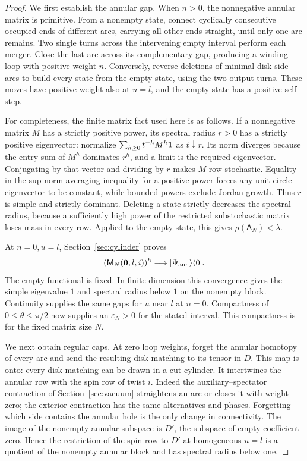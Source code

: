 \begin{proof}
We first establish the annular gap. When \(n>0\), the nonnegative annular matrix is primitive. From a nonempty state, connect cyclically consecutive occupied ends of different arcs, carrying all other ends straight, until only one arc remains. Two single turns across the intervening empty interval perform each merger. Close the last arc across its complementary gap, producing a winding loop with positive weight \(n\). Conversely, reverse deletions of minimal disk-side arcs to build every state from the empty state, using the two output turns. These moves have positive weight also at \(u=l\), and the empty state has a positive self-step.

For completeness, the finite matrix fact used here is as follows. If a nonnegative matrix \(M\) has a strictly positive power, its spectral radius \(r>0\) has a strictly positive eigenvector: normalize
\(\sum_{h\ge0}t^{-h}M^h{\bf1}\) as \(t\downarrow r\). Its norm diverges because the entry sum of \(M^h\) dominates \(r^h\), and a limit is the required eigenvector. Conjugating by that vector and dividing by \(r\) makes \(M\) row-stochastic. Equality in the sup-norm averaging inequality for a positive power forces any unit-circle eigenvector to be constant, while bounded powers exclude Jordan growth. Thus \(r\) is simple and strictly dominant. Deleting a state strictly decreases the spectral radius, because a sufficiently high power of the restricted substochastic matrix loses mass in every row. Applied to the empty state, this gives \(\rho(\mathsf A_N)<\lambda\).

At \(n=0,u=l\), Section~\ref{sec:cylinder} proves
\[
 (\mathsf M_N(\mathbf0,l,i))^h
 \longrightarrow |\Psi_{\rm ann}\rangle\langle0|.
\]
The empty functional is fixed. In finite dimension this convergence gives the simple eigenvalue \(1\) and spectral radius below \(1\) on the nonempty block. Continuity supplies the same gaps for \(u\) near \(l\) at \(n=0\). Compactness of \(0\le\theta\le\pi/2\) now supplies an \(\varepsilon_N>0\) for the stated interval. This compactness is for the fixed matrix size \(N\).

We next obtain regular caps. At zero loop weights, forget the annular homotopy of every arc and send the resulting disk matching to its tensor in \(D\). This map is onto: every disk matching can be drawn in a cut cylinder. It intertwines the annular row with the spin row of twist \(i\). Indeed the auxiliary--spectator contraction of Section~\ref{sec:vacuum} straightens an arc or closes it with weight zero; the exterior contraction has the same alternatives and phases. Forgetting which side contains the annular hole is the only change in connectivity. The image of the nonempty annular subspace is \(D'\), the subspace of empty coefficient zero. Hence the restriction of the spin row to \(D'\) at homogeneous \(u=l\) is a quotient of the nonempty annular block and has spectral radius below one.


\end{proof}
